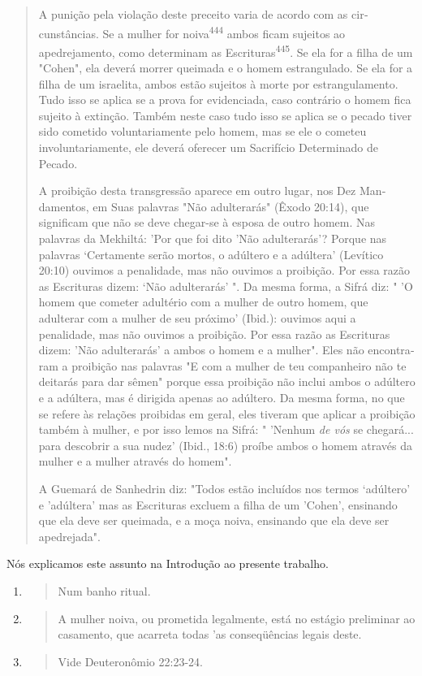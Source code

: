 \begin{quote}
A punição pela violação deste preceito varia de acordo com as
cir­cunstâncias. Se a mulher for noiva\textsuperscript{444} ambos ficam
sujeitos ao apedrejamen­to, como determinam as
Escrituras\textsuperscript{445}. Se ela for a filha de um "Cohen", ela
deverá morrer queimada e o homem estrangulado. Se ela for a filha de um
is­raelita, ambos estão sujeitos à morte por estrangulamento. Tudo isso
se aplica se a prova for evidenciada, caso contrário o homem fica
sujeito à extinção. Tam­bém neste caso tudo isso se aplica se o pecado
tiver sido cometido voluntaria­mente pelo homem, mas se ele o cometeu
involuntariamente, ele deverá ofere­cer um Sacrifício Determinado de
Pecado.

A proibição desta transgressão aparece em outro lugar, nos Dez
Man­damentos, em Suas palavras "Não adulterarás" (Êxodo 20:14), que
significam que não se deve chegar-se à esposa de outro homem. Nas
palavras da Mekhiltá: 'Por que foi dito 'Não adulterarás'? Porque nas
palavras `Certamente serão mor­tos, o adúltero e a adúltera' (Levítico
20:10) ouvimos a penalidade, mas não ouvimos a proibição. Por essa razão
as Escrituras dizem: `Não adulterarás' ". Da mesma forma, a Sifrá diz: "
'O homem que cometer adultério com a mulher de outro homem, que
adulterar com a mulher de seu próximo' (Ibid.): ouvi­mos aqui a
penalidade, mas não ouvimos a proibição. Por essa razão as Escritu­ras
dizem: 'Não adulterarás' a ambos o homem e a mulher". Eles não
encontra­ram a proibição nas palavras "E com a mulher de teu companheiro
não te dei­tarás para dar sêmen" porque essa proibição não inclui ambos
o adúltero e a adúltera, mas é dirigida apenas ao adúltero. Da mesma
forma, no que se refere às relações proibidas em geral, eles tiveram que
aplicar a proibição também à mulher, e por isso lemos na Sifrá: "
'Nenhum \emph{de vós} se chegará... para desco­brir a sua nudez' (Ibid.,
18:6) proíbe ambos o homem através da mulher e a mulher através do
homem".

A Guemará de Sanhedrin diz: "Todos estão incluídos nos termos `adúltero'
e 'adúltera' mas as Escrituras excluem a filha de um 'Cohen', ensi­nando
que ela deve ser queimada, e a moça noiva, ensinando que ela deve ser
apedrejada".
\end{quote}

Nós explicamos este assunto na Introdução ao presente trabalho.

\begin{enumerate}
\def\labelenumi{\arabic{enumi}.}
\setcounter{enumi}{442}
\item
 \begin{quote}
 Num banho ritual.
 \end{quote}
\item
 \begin{quote}
 A mulher noiva, ou prometida legalmente, está no estágio preliminar ao
 casamento, que acar­reta todas 'as conseqüências legais deste.
 \end{quote}
\item
 \begin{quote}
 Vide Deuteronômio 22:23-24.
 \end{quote}
\end{enumerate}

